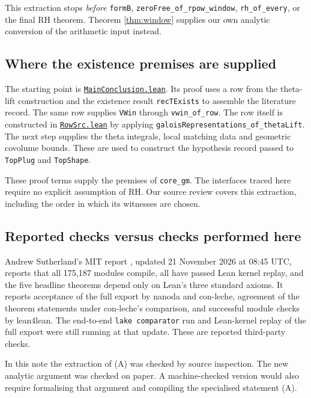 \documentclass[11pt,a4paper]{article}
\theoremstyle{remark}\newtheorem{remark}[theorem]{Remark}
\begin{document}
This extraction stops \emph{before} \texttt{formB},
\texttt{zeroFree\_of\_rpow\_window}, \texttt{rh\_of\_every},
or the final RH theorem. Theorem \ref{thm:window} supplies our
own analytic conversion of the arithmetic input instead.

\subsection{Where the existence premises are supplied}
The starting point is
\href{https://github.com/leanprover-community/riemann-hypothesis/blob/40e56bab/src/Development/AutomorphicArithmetic/CharacterBoxes/MainConclusion.lean}{\texttt{MainConclusion.lean}}.
Its proof uses a row from the theta-lift construction and the existence
result \texttt{recTExists} to assemble the literature record. The same
row supplies \texttt{VWin} through \texttt{vwin\_of\_row}.
The row itself is constructed in
\href{https://github.com/leanprover-community/riemann-hypothesis/blob/40e56bab/src/Development/AutomorphicArithmetic/Foundations/GaloisRepresentations/IntegralStructures/RowSrc.lean}{\texttt{RowSrc.lean}}
by applying \texttt{galoisRepresentations\_of\_thetaLift}.
The next step supplies the theta integrals, local matching data and
geometric covolume bounds. These are used to construct the
hypothesis record passed to \texttt{TopPlug} and \texttt{TopShape}.

These proof terms supply the premises of \texttt{core\_gm}.
The interfaces traced here require no explicit assumption of RH.
Our source review covers this extraction, including the order in
which its witnesses are chosen.

\subsection{Reported checks versus checks performed here}
Andrew Sutherland's MIT report \cite{MIT}, updated
21 November 2026 at 08:45 UTC, reports that all 175,187 modules
compile, all have passed Lean kernel replay, and the five headline
theorems depend only on Lean's three standard axioms. It reports
acceptance of the full export by nanoda and con-leche, agreement of
the theorem statements under con-leche's comparison, and successful
module checks by lean4lean. The end-to-end \texttt{lake comparator}
run and Lean-kernel replay of the full export were still running
at that update. These are reported third-party checks.

In this note the extraction of (A) was checked by source inspection.
The new analytic argument was checked on paper. A machine-checked
version would also require formalising that argument and compiling
the specialised statement (A).
\end{document}

